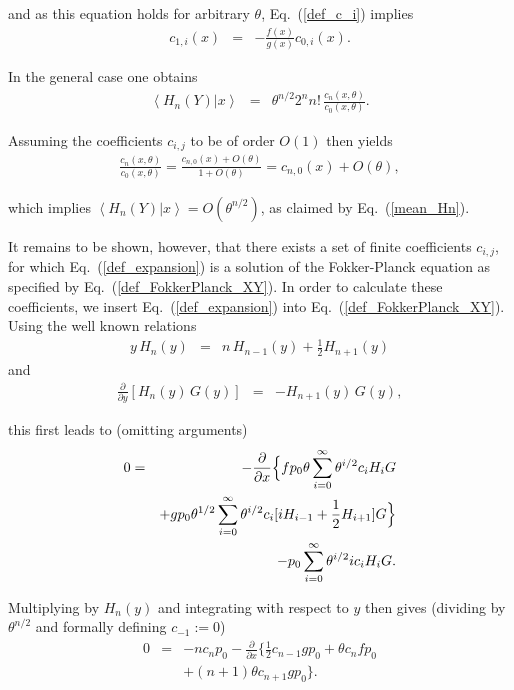 \documentclass[aps,twocolumn,superscriptaddress,showpacs,showkeys]{revtex4}
\newcommand{\p}{\partial}
\newcommand{\fracpp}[1]{\frac{\p}{\p#1}}
\begin{document}
{\noindent and as this equation holds for arbitrary $\theta$, Eq.~(\ref{def_c_i}) implies
%
\begin{eqnarray}\label{relation_c1i_c0i}
c_{1,i}(x) &=& -\frac{f(x)}{g(x)}c_{0,i}(x).
\end{eqnarray}

\noindent In the general case one obtains
%
\begin{eqnarray}
\left<H_n(Y)|x\right> &=& \theta^{n/2}2^n n!\,\frac{c_n(x,\theta)}{c_0(x,\theta)}.
\end{eqnarray}

\noindent Assuming the coefficients $c_{i,j}$ to be of order $O(1)$ then yields
%
\begin{eqnarray}
\frac{c_n(x,\theta)}{c_0(x,\theta)} = \frac{c_{n,0}(x)+O(\theta)}{1+O(\theta)} = c_{n,0}(x)+O(\theta),
\end{eqnarray}

\noindent which implies $\left<H_n(Y)|x\right>=O(\theta^{n/2})$, as claimed by Eq.~(\ref{mean_Hn}).

It remains to be shown,
however, that there exists a set of finite coefficients $c_{i,j}$, for which
Eq.~(\ref{def_expansion}) is a solution of the Fokker-Planck equation as specified by Eq.~(\ref{def_FokkerPlanck_XY}).
In order to calculate these coefficients, we insert Eq.~(\ref{def_expansion}) into Eq.~(\ref{def_FokkerPlanck_XY}).
Using the well known relations
%
\begin{eqnarray}
y\, H_n(y) &=& n\,H_{n-1}(y)+\frac{1}{2}H_{n+1}(y)
\end{eqnarray}
%
\noindent and
%
\begin{eqnarray}
\frac{\p}{\p y}[H_n(y)\,G(y)] &=& -H_{n+1}(y)\,G(y),
\end{eqnarray}

\noindent this first leads to (omitting arguments)
%
\begin{eqnarray}
0 &=& -\fracpp{x}\Big\{
f p_0\theta\sum_{i=0}^\infty\theta^{i/2}c_iH_iG \cr&&
+g p_0\theta^{1/2}\sum_{i=0}^\infty\theta^{i/2}c_i[ iH_{i-1}+\frac{1}{2}H_{i+1} ]G
\Big\}\cr&&
-p_0\sum_{i=0}^\infty\theta^{i/2}ic_iH_iG .
\end{eqnarray}

\noindent Multiplying by $H_n(y)$ and integrating with respect to $y$ then gives (dividing by $\theta^{n/2}$ and formally
defining $c_{-1}:=0$)
%
\begin{eqnarray}
0 &=& -nc_n p_0 -\fracpp{x}\Big\{ \frac{1}{2}c_{n-1}g p_0
+\theta c_n f p_0 \nonumber\\&&
+ (n+1)\theta c_{n+1}g p_0
\Big\}.
\end{eqnarray}

}
\end{document}
